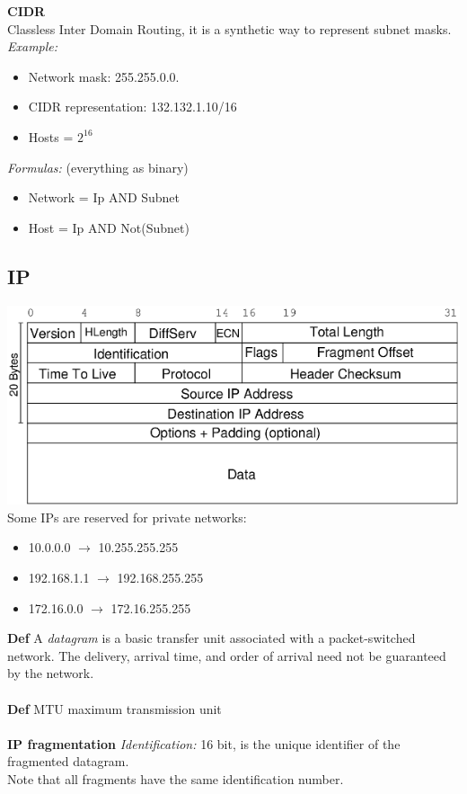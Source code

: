 \documentclass[10pt,a4paper]{article}
\begin{document}
\textbf{CIDR}\\
Classless Inter Domain Routing, it is a synthetic way to represent subnet masks.\\
\emph{Example: }
\begin{itemize}
\item Network mask: 255.255.0.0.
\item CIDR representation: 132.132.1.10/16
\item Hosts = $2^{16}$
\end{itemize}
\emph{Formulas:} (everything as binary)
\begin{itemize}
\item Network = Ip AND Subnet
\item Host = Ip AND Not(Subnet)
\end{itemize}
\newpage
\subsection{IP}
\includegraphics[scale=0.5]{ip.png}\\
Some IPs are reserved for private networks:
\begin{itemize}
\item 10.0.0.0 $\to$ 10.255.255.255
\item 192.168.1.1 $\to$ 192.168.255.255
\item 172.16.0.0 $\to$ 172.16.255.255
\end{itemize}
\textbf{Def} A \emph{datagram} is a basic transfer unit associated with a packet-switched network. The delivery, arrival time, and order of arrival need not be guaranteed by the network.\\\\
\textbf{Def} MTU maximum transmission unit\\\\
\textbf{IP fragmentation}
\emph{Identification:} 16 bit, is the unique identifier of the fragmented datagram.\\
Note that all fragments have the same identification number.\\
\end{document}
